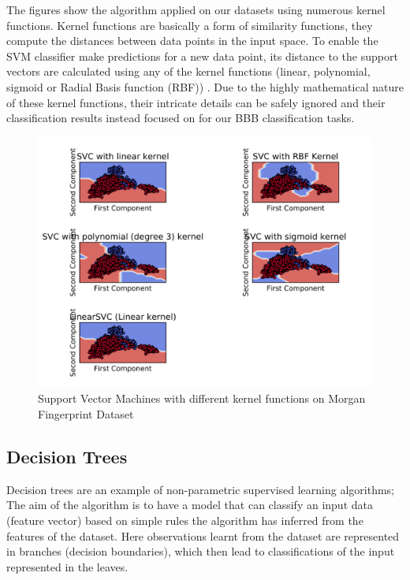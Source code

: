 \documentclass[a4paper,12pt]{report}
\begin{document}
		The figures show the algorithm applied on our datasets using numerous kernel functions. Kernel functions are basically a form of similarity functions, they compute the distances between data points in the input space. To enable the SVM classifier make predictions for a new data point, its distance to the support vectors are calculated using any of the kernel functions (linear, polynomial, sigmoid or Radial Basis function (RBF)) \cite{StephenM2014}. Due to the highly mathematical nature of these kernel functions, their intricate details can be safely ignored and their classification results instead focused on for our BBB classification tasks. 
		
		\begin{figure}[H]
			\centering
			\includegraphics[width=\textwidth,scale=1,totalheight=0.4\textheight]{images/fps_decision_svm}
			\caption{Support Vector Machines with different kernel functions on Morgan Fingerprint Dataset}
			\label{fig:svm_fps}
		\end{figure}
		
		
		
		
		\subsection{Decision Trees}
			Decision trees are an example of non-parametric supervised learning algorithms; The aim of the algorithm is to have a model that can classify an input data (feature vector) based on simple rules the algorithm has inferred from the features of the dataset. Here observations learnt from the dataset are represented in branches (decision boundaries), which then lead to classifications of the input represented in the leaves. 
			
\end{document}
